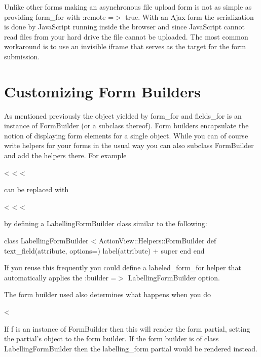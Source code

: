\documentclass[10pt]{book}
\newenvironment{code}{%
  \scriptsize
    \verbatim
}{%
    \endverbatim
    \newline
}
\begin{document}
Unlike other forms making an asynchronous file upload form is not as simple as providing form\_for with :remote =$>$ true.  With an Ajax form the serialization is done by JavaScript running  inside the browser and since JavaScript cannot read files from your hard  drive the file cannot be uploaded. The most common workaround is to use  an invisible iframe that serves as the target for the form submission.

\section{ Customizing Form Builders}

As mentioned previously the object yielded by form\_for and fields\_for  is an instance of FormBuilder (or a subclass thereof). Form builders  encapsulate the notion of displaying form elements for a single object.  While you can of course write helpers for your forms in the usual way  you can also subclass FormBuilder and add the helpers there. For example
\begin{code}
<%
  <%
<%
\end{code}

can be replaced with
\begin{code}
<%
  <%
<%
\end{code}

by defining a LabellingFormBuilder class similar to the following:
\begin{code}
class LabellingFormBuilder < ActionView::Helpers::FormBuilder
  def text_field(attribute, options={})
    label(attribute) + super
  end
end
\end{code}

If you reuse this frequently you could define a labeled\_form\_for helper that automatically applies the :builder =$>$ LabellingFormBuilder option.

The form builder used also determines what happens when you do
\begin{code}
<%
\end{code}

If f is an instance of FormBuilder then this will render the form partial, setting the partial’s object to the form builder. If the form builder is of class LabellingFormBuilder then the labelling\_form partial would be rendered instead.
\end{document}
